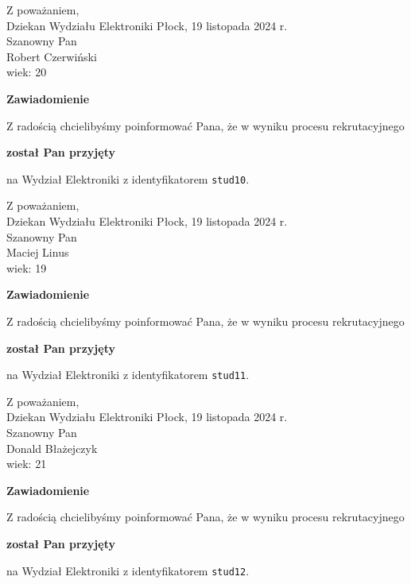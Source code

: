 \documentclass[12pt,a4paper]{article}
\begin{document}
\noindent
Z poważaniem,\\
Dziekan
Wydziału Elektroniki
\newpage
\hfill Płock, 19 listopada 2024 r.\\ 
\noindent 
Szanowny Pan \\
Robert Czerwiński \\
wiek: 20

\bigskip

\begin{center}
{\Large\textbf{Zawiadomienie}}
\end{center}
\bigskip
Z radością chcielibyśmy poinformować Pana, że w wyniku procesu rekrutacyjnego
\begin{center}
\textsf{\textbf{został Pan przyjęty}} 
\end{center}
na Wydział Elektroniki z identyfikatorem \verb|stud10|.
\vspace{2cm}

\noindent
Z poważaniem,\\
Dziekan
Wydziału Elektroniki
\newpage
\hfill Płock, 19 listopada 2024 r.\\ 
\noindent 
Szanowny Pan \\
Maciej Linus \\
wiek: 19

\bigskip

\begin{center}
{\Large\textbf{Zawiadomienie}}
\end{center}
\bigskip
Z radością chcielibyśmy poinformować Pana, że w wyniku procesu rekrutacyjnego
\begin{center}
\textsf{\textbf{został Pan przyjęty}} 
\end{center}
na Wydział Elektroniki z identyfikatorem \verb|stud11|.
\vspace{2cm}

\noindent
Z poważaniem,\\
Dziekan
Wydziału Elektroniki
\newpage
\hfill Płock, 19 listopada 2024 r.\\ 
\noindent 
Szanowny Pan \\
Donald Błażejczyk \\
wiek: 21

\bigskip

\begin{center}
{\Large\textbf{Zawiadomienie}}
\end{center}
\bigskip
Z radością chcielibyśmy poinformować Pana, że w wyniku procesu rekrutacyjnego
\begin{center}
\textsf{\textbf{został Pan przyjęty}} 
\end{center}
na Wydział Elektroniki z identyfikatorem \verb|stud12|.
\vspace{2cm}
\end{document}
